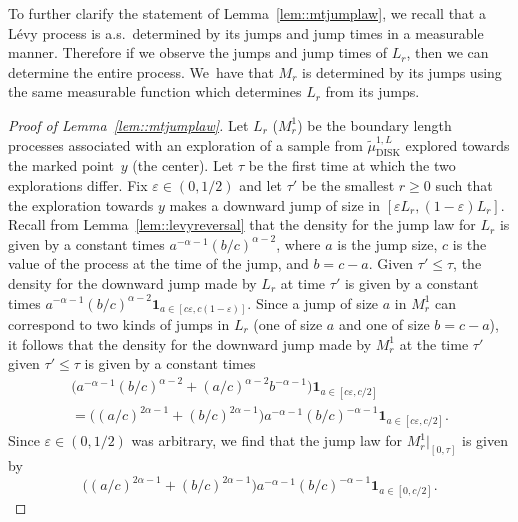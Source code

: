 \documentclass[10pt]{amsart}
\let\epsilon\varepsilon
\theoremstyle{plain}
\numberwithin{theorem}{section}
\theoremstyle{definition}
\newcommand{\one}{{\mathbf 1}}
\newcommand{\tmudonel}{\wt{\mu}_{ \mathrm{DISK}}^{1, L}}
\let\wt\widetilde
\begin{document}
To further clarify the statement of Lemma~\ref{lem::mtjumplaw}, we recall that a Lévy process is a.s.\ determined by its jumps and jump times in a measurable manner. Therefore if we observe the jumps and jump times of $L_r$, then we can determine the entire process. We~have that $M_r$ is determined by its jumps using the same measurable function which determines $L_r$ from its jumps.

\begin{proof}[Proof of Lemma~\ref{lem::mtjumplaw}]
Let $L_r$ (\resp $M_r^1$) be the boundary length processes associated with an exploration of a sample from $\tmudonel$ explored towards the marked point~$y$ (\resp the center). Let $\tau$ be the first time at which the two explorations differ. Fix $\epsilon \in (0,1/2)$ and let $\tau'$ be the smallest $r \geq 0$ such that the exploration towards $y$ makes a downward jump of size in $[\epsilon L_r,(1-\epsilon) L_r]$. Recall from Lemma~\ref{lem::levyreversal} that the density for the jump law for $L_r$ is given by a constant times $a^{-\alpha-1} (b/c)^{\alpha - 2}$, where $a$ is the jump size, $c$ is the value of the process at the time of the jump, and $b = c-a$. Given $\tau' \leq \tau$, the density for the downward jump made by $L_r$ at time $\tau'$ is given by a constant times $a^{-\alpha-1} (b/c)^{\alpha-2} \one_{a \in [c \epsilon,c(1-\epsilon)]}$. Since a jump of size $a$ in $M_r^1$ can correspond to two kinds of jumps in $L_r$ (one of size $a$ and one of size $b=c-a$), it follows that the density for the downward jump made by $M_r^1$ at the time $\tau'$ given $\tau' \leq \tau$ is given by a constant times
\begin{multline*}
\bigl(a^{-\alpha-1} (b/c)^{\alpha - 2} + (a/c)^{\alpha-2} b^{-\alpha - 1}\bigr)\one_{a \in [c \epsilon,c/2]}\\
= \big( (a/c)^{2\alpha-1} + (b/c)^{2\alpha - 1}\bigr) a^{-\alpha - 1} (b/c)^{-\alpha-1} \one_{a \in [c \epsilon,c/2]}.
\end{multline*}
Since $\epsilon \in (0,1/2)$ was arbitrary, we find that the jump law for $M_r^1|_{[0,\tau]}$ is given by
\begin{equation}
\label{eqn::mtonejump}
\big( (a/c)^{2\alpha-1} + (b/c)^{2\alpha - 1}\bigr) a^{-\alpha - 1} (b/c)^{-\alpha-1} \one_{a \in [0,c/2]}.
\end{equation}


\end{proof}
\end{document}
